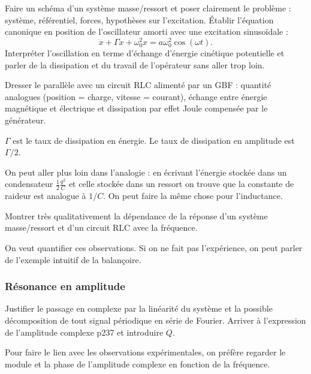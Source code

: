 Faire un schéma d'un système masse/ressort et poser clairement le problème : système, référentiel, forces, hypothèses sur l'excitation.
Établir l'équation canonique en position de l'oscillateur amorti avec une excitation sinusoïdale :
\begin{equation}
\ddot{x} + \Gamma \dot{x} + \omega_0^2 x = a \omega_0^2 \cos(\omega t).
\label{eq:lp24_osc}
\end{equation}
Interpréter l'oscillation en terme d'échange d'énergie cinétique potentielle et parler de la dissipation et du travail de l'opérateur sans aller trop loin.

Dresser le parallèle avec un circuit RLC alimenté par un GBF : quantité analogues (position = charge, vitesse = courant), échange entre énergie magnétique et électrique et dissipation par effet Joule compensée par le générateur.

\begin{remarque}
$\Gamma$ est le taux de dissipation en énergie.
Le taux de dissipation en amplitude est $\Gamma/2$.

\noindent
On peut aller plus loin dans l'analogie : en écrivant l'énergie stockée dans un condensateur $\frac{1}{2}\frac{q^2}{C}$ et celle stockée dans un ressort on trouve que la constante de raideur est analogue à $1/C$.
On peut faire la même chose pour l'inductance.
\end{remarque}

\begin{experience}
Montrer très qualitativement la dépendance de la réponse d'un système masse/ressort et d'un circuit RLC avec la fréquence. 
\end{experience}

\begin{transition}
On veut quantifier ces observations.
Si on ne fait pas l'expérience, on peut parler de l'exemple intuitif de la balançoire.
\end{transition}

\subsubsection{Résonance en amplitude}

Justifier le passage en complexe par la linéarité du système et la possible décomposition de tout signal périodique en série de Fourier.
Arriver à l'expression de l'amplitude complexe \cite{Michel2017} p237 et introduire $Q$.

Pour faire le lien avec les observations expérimentales, on préfère regarder le module et la phase de l'amplitude complexe en fonction de la fréquence.


